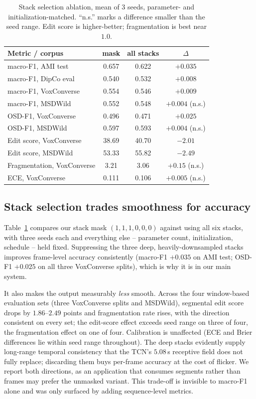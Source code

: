 \documentclass[journal]{IEEEtran}
\begin{document}
\begin{table}[t]
\centering
\caption{Stack selection ablation, mean of 3 seeds, parameter- and
initialization-matched. ``n.s.'' marks a difference smaller than the seed
range. Edit score is higher-better; fragmentation is best near $1.0$.}
\label{tab:ablation}
\small
\setlength{\tabcolsep}{4pt}
\begin{tabular}{lccc}
\toprule
Metric / corpus & mask & all stacks & $\Delta$ \\
\midrule
macro-F1, AMI test        & 0.657 & 0.622 & $+0.035$ \\
macro-F1, DipCo eval      & 0.540 & 0.532 & $+0.008$ \\
macro-F1, VoxConverse     & 0.554 & 0.546 & $+0.009$ \\
macro-F1, MSDWild         & 0.552 & 0.548 & $+0.004$ (n.s.) \\
\midrule
OSD-F1, VoxConverse       & 0.496 & 0.471 & $+0.025$ \\
OSD-F1, MSDWild           & 0.597 & 0.593 & $+0.004$ (n.s.) \\
\midrule
Edit score, VoxConverse   & 38.69 & 40.70 & $-2.01$ \\
Edit score, MSDWild       & 53.33 & 55.82 & $-2.49$ \\
Fragmentation, VoxConverse & 3.21 & 3.06 & $+0.15$ (n.s.) \\
\midrule
ECE, VoxConverse          & 0.111 & 0.106 & $+0.005$ (n.s.) \\
\bottomrule
\end{tabular}
\end{table}

\subsection{Stack selection trades smoothness for accuracy}
Table~\ref{tab:ablation} compares our stack mask $(1,1,1,0,0,0)$ against
using all six stacks, with three seeds each and everything else -- parameter
count, initialization, schedule -- held fixed. Suppressing the three deep,
heavily-downsampled stacks improves frame-level accuracy consistently
(macro-F1 $+0.035$ on AMI test; OSD-F1 $+0.025$ on all three VoxConverse
splits), which is why it is in our main system.

It also makes the output measurably \emph{less} smooth. Across the four
window-based evaluation sets (three VoxConverse splits and MSDWild),
segmental edit score drops by $1.86$--$2.49$ points and fragmentation rate
rises, with the direction consistent on every set; the edit-score effect
exceeds seed range on three of four, the fragmentation effect on one of
four. Calibration is unaffected (ECE and Brier differences lie within seed
range throughout). The deep stacks evidently supply long-range temporal
consistency that the TCN's $5.08$\,s receptive field does not fully replace;
discarding them buys per-frame accuracy at the cost of flicker. We report
both directions, as an application that consumes segments rather than frames
may prefer the unmasked variant. This trade-off is invisible to macro-F1
alone and was only surfaced by adding sequence-level metrics.
\end{document}
